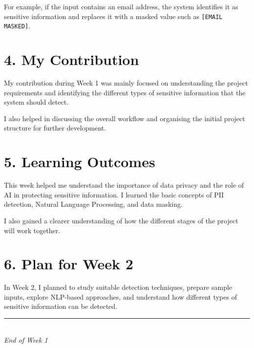 \documentclass[11pt,a4paper]{article}
\begin{document}
\vspace{5pt}

For example, if the input contains an email address, the system identifies
it as sensitive information and replaces it with a masked value such as
\texttt{[EMAIL MASKED]}.

\section*{4. My Contribution}

My contribution during Week 1 was mainly focused on understanding the
project requirements and identifying the different types of sensitive
information that the system should detect.

I also helped in discussing the overall workflow and organising the
initial project structure for further development.

\section*{5. Learning Outcomes}

This week helped me understand the importance of data privacy and the role
of AI in protecting sensitive information. I learned the basic concepts
of PII detection, Natural Language Processing, and data masking.

I also gained a clearer understanding of how the different stages of the
project will work together.

\section*{6. Plan for Week 2}

In Week 2, I planned to study suitable detection techniques, prepare
sample inputs, explore NLP-based approaches, and understand how different
types of sensitive information can be detected.

\vfill

\begin{center}
    \textcolor{darkblue}{\rule{0.35\textwidth}{0.5pt}}\\[3pt]
    \textit{\small End of Week 1}
\end{center}
\end{document}
